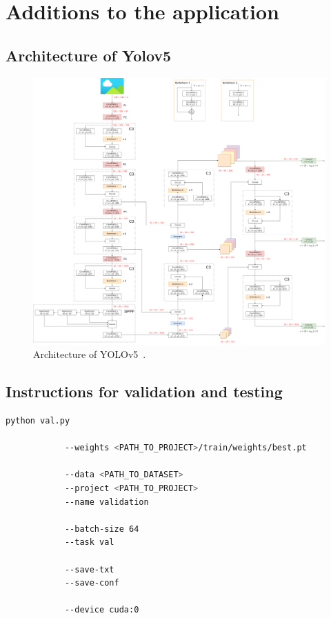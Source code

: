\chapter{Additions to the application}\label{chpt:applicationAdditions}
\glsresetall

\section{Architecture of Yolov5}\label{sec:aa:archyolov5}

\begin{figure}[H]
	\centering
	\includegraphics[width=1.0\linewidth]{images/a01-arch-yolov5}
	\caption[Architecture of YOLOv5.]{Architecture of YOLOv5~\cite{archYolov5}.}
	\label{fig:aa:archyolov5}
\end{figure}

\section{Instructions for validation and testing}

\begin{minipage}{\linewidth}
	\begin{lstlisting}[language=Bash, keywordstyle=\color{black}, 
		caption=General command to run the validation task of YOLOv5., label=lst:aa:valcmd]
		python val.py
			
			--weights <PATH_TO_PROJECT>/train/weights/best.pt
			
			--data <PATH_TO_DATASET>
			--project <PATH_TO_PROJECT>
			--name validation
			
			--batch-size 64
			--task val
			
			--save-txt
			--save-conf
			
			--device cuda:0
	\end{lstlisting}
\end{minipage}

